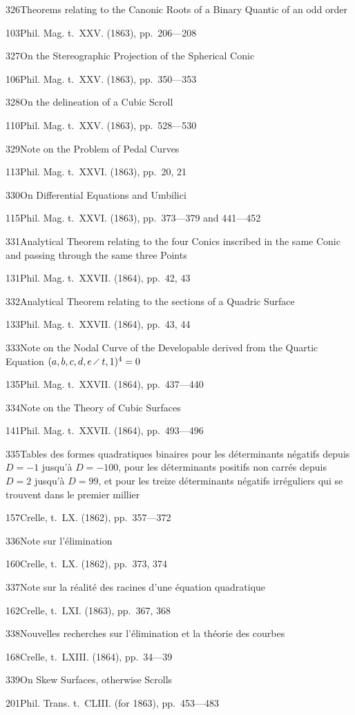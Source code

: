 \documentclass[11pt,a4paper]{book}
\providecommand{\tocentry}[2]{#1\dotfill #2\par}
\begin{document}
\newpage

\tocentry{326}{Theorems relating to the Canonic Roots of a Binary Quantic of an odd order}{103}{Phil. Mag. t.~XXV. (1863), pp.~206---208}

\tocentry{327}{On the Stereographic Projection of the Spherical Conic}{106}{Phil. Mag. t.~XXV. (1863), pp.~350---353}

\tocentry{328}{On the delineation of a Cubic Scroll}{110}{Phil. Mag. t.~XXV. (1863), pp.~528---530}

\tocentry{329}{Note on the Problem of Pedal Curves}{113}{Phil. Mag. t.~XXVI. (1863), pp.~20, 21}

\tocentry{330}{On Differential Equations and Umbilici}{115}{Phil. Mag. t.~XXVI. (1863), pp.~373---379 and 441---452}

\tocentry{331}{Analytical Theorem relating to the four Conics inscribed in the same Conic and passing through the same three Points}{131}{Phil. Mag. t.~XXVII. (1864), pp.~42, 43}

\tocentry{332}{Analytical Theorem relating to the sections of a Quadric Surface}{133}{Phil. Mag. t.~XXVII. (1864), pp.~43, 44}

\tocentry{333}{Note on the Nodal Curve of the Developable derived from the Quartic Equation $(a, b, c, d, e \,\raisebox{0.3ex}{\scriptsize$\diagup$}\, t, 1)^4 = 0$}{135}{Phil. Mag. t.~XXVII. (1864), pp.~437---440}

\tocentry{334}{Note on the Theory of Cubic Surfaces}{141}{Phil. Mag. t.~XXVII. (1864), pp.~493---496}

\tocentry{335}{Tables des formes quadratiques binaires pour les d\'{e}terminants n\'{e}gatifs depuis $D = -1$ jusqu'\`{a} $D = -100$, pour les d\'{e}terminants positifs non carr\'{e}s depuis $D = 2$ jusqu'\`{a} $D = 99$, et pour les treize d\'{e}terminants n\'{e}gatifs irr\'{e}guliers qui se trouvent dans le premier millier}{157}{Crelle, t.~LX. (1862), pp.~357---372}

\tocentry{336}{Note sur l'\'{e}limination}{160}{Crelle, t.~LX. (1862), pp.~373, 374}

\tocentry{337}{Note sur la r\'{e}alit\'{e} des racines d'une \'{e}quation quadratique}{162}{Crelle, t.~LXI. (1863), pp.~367, 368}

\newpage

\tocentry{338}{Nouvelles recherches sur l'\'{e}limination et la th\'{e}orie des courbes}{168}{Crelle, t.~LXIII. (1864), pp.~34---39}

\tocentry{339}{On Skew Surfaces, otherwise Scrolls}{201}{Phil. Trans. t.~CLIII. (for 1863), pp.~453---483}
\end{document}
